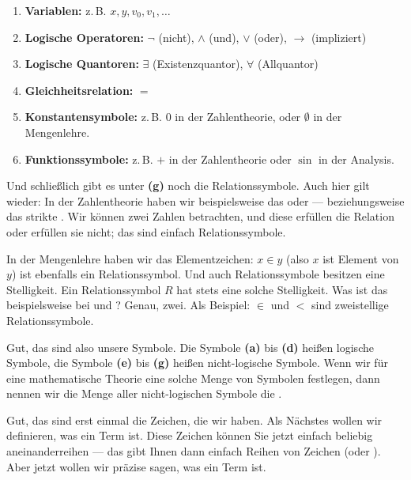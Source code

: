 \begin{math-stroke}
\begin{enumerate}[label=\textbf{(\alph*)}]
    \item \textbf{Variablen:} z.\,B. $x, y, v_0, v_1, \dots$
    \item \textbf{Logische Operatoren:} $\neg$ (nicht), $\wedge$ (und), $\vee$ (oder), $\rightarrow$ (impliziert)
    \item \textbf{Logische Quantoren:} $\exists$ (Existenzquantor), $\forall$ (Allquantor)
    \item \textbf{Gleichheitsrelation:} $=$
    \item \textbf{Konstantensymbole:} z.\,B. $0$ in der Zahlentheorie, oder $\emptyset$ in der Mengenlehre.
    \item \textbf{Funktionssymbole:} z.\,B. $+$ in der Zahlentheorie oder $\sin$ in der Analysis.
\end{enumerate}
\end{math-stroke}


\begin{spoken-clean}[00:31:29 - 00:33:14]
Und schließlich gibt es unter \textbf{(g)} noch die Relationssymbole. Auch hier gilt wieder: In der Zahlentheorie haben wir beispielsweise das  oder  --- beziehungsweise das strikte . Wir können zwei Zahlen betrachten, und diese erfüllen die Relation oder erfüllen sie nicht; das sind einfach Relationssymbole.

In der Mengenlehre haben wir das Elementzeichen: $x \in y$ (also $x$ ist Element von $y$) ist ebenfalls ein Relationssymbol. Und auch Relationssymbole besitzen eine Stelligkeit. Ein Relationssymbol $R$ hat stets eine solche Stelligkeit. Was ist das beispielsweise bei  und ? Genau, zwei. Als Beispiel: $\in$ und $<$ sind zweistellige Relationssymbole.
\end{spoken-clean}

\begin{spoken-clean}[00:33:14 - 00:34:59]
Gut, das sind also unsere Symbole. Die Symbole \textbf{(a)} bis \textbf{(d)} heißen logische Symbole, die Symbole \textbf{(e)} bis \textbf{(g)} heißen nicht-logische Symbole. Wenn wir für eine mathematische Theorie eine solche Menge von Symbolen festlegen, dann nennen wir die Menge aller nicht-logischen Symbole die .

Gut, das sind erst einmal die Zeichen, die wir haben. Als Nächstes wollen wir definieren, was ein Term ist. Diese Zeichen können Sie jetzt einfach beliebig aneinanderreihen --- das gibt Ihnen dann einfach Reihen von Zeichen (oder ). Aber jetzt wollen wir präzise sagen, was ein Term ist.
\end{spoken-clean}

